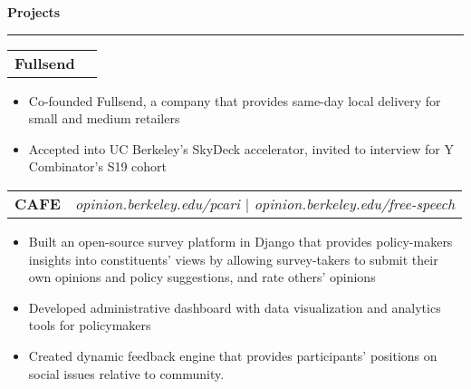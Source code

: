 \documentclass[11pt,letterpaper]{article}
\makeatletter
\newenvironment{topic}[1]
    {
    {\Large \centerline{#1}}
    \vspace*{0.03in}
    \hrule 
    \vspace*{0.05in}
    }
    {}
\newenvironment{event}
    {
    \begin{tabular*}{\textwidth}{l@{\extracolsep{\fill}}r}
    }
    {
    \end{tabular*}
    }
\makeatother
\begin{document}
    \begin{topic}{\textbf{Projects}}
        \begin{event}
            \textbf{Fullsend}
        \end{event}
            \begin{itemize}
                \item Co-founded Fullsend, a company that provides same-day local delivery for small and medium retailers
                \item Accepted into UC Berkeley's SkyDeck accelerator, invited to interview for Y Combinator's S19 cohort
            \end{itemize}

        \begin{event}
            \textbf{CAFE} & \emph{opinion.berkeley.edu/pcari $\vert$ opinion.berkeley.edu/free-speech}
        \end{event}
            \begin{itemize}
                \item Built an open-source survey platform in Django that provides policy-makers insights into constituents' views by allowing survey-takers to submit their own opinions and policy suggestions, and rate others' opinions
                \item Developed administrative dashboard with data visualization and analytics tools for policymakers
                \item Created dynamic feedback engine that provides participants' positions on social issues relative to community.
            \end{itemize}



\end{topic}
\end{document}

